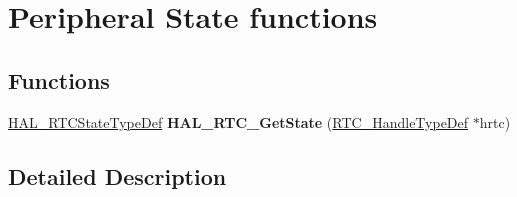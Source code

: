 \hypertarget{group___r_t_c___exported___functions___group5}{}\section{Peripheral State functions}
\label{group___r_t_c___exported___functions___group5}
\subsection*{Functions}
\begin{DoxyCompactItemize}
\item 
\mbox{\label{group___r_t_c___exported___functions___group5_ga527ac04240b47a22bf5ff469609eaa4d}} 
\hyperlink{group___r_t_c___exported___types_ga1e2460a2d13c4efc7a2a1ab2a1ebd32b}{H\+A\+L\+\_\+\+R\+T\+C\+State\+Type\+Def} {\bfseries H\+A\+L\+\_\+\+R\+T\+C\+\_\+\+Get\+State} (\hyperlink{struct_r_t_c___handle_type_def}{R\+T\+C\+\_\+\+Handle\+Type\+Def} $\ast$hrtc)
\end{DoxyCompactItemize}


\subsection{Detailed Description}
